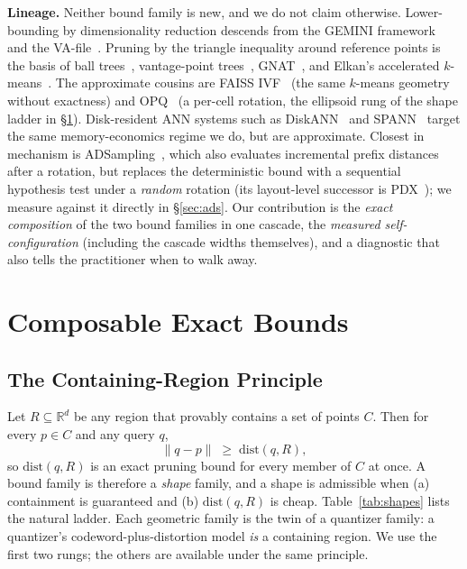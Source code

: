 \documentclass[sigconf,nonacm]{acmart}
\begin{document}
\textbf{Lineage.} Neither bound family is new, and we do not claim
otherwise. Lower-bounding by dimensionality reduction descends from the
GEMINI framework~\cite{gemini} and the VA-file~\cite{vafile}. Pruning by
the triangle inequality around reference points is the basis of ball
trees~\cite{balltree}, vantage-point trees~\cite{vptree}, GNAT~\cite{gnat},
and Elkan's accelerated $k$-means~\cite{elkan}. The approximate cousins are
FAISS IVF~\cite{faiss} (the same $k$-means geometry without exactness) and
OPQ~\cite{opq} (a per-cell rotation, the ellipsoid rung of the shape ladder
in \S\ref{sec:theory}). Disk-resident ANN systems such as
DiskANN~\cite{diskann} and SPANN~\cite{spann} target the same
memory-economics regime we do, but are approximate. Closest in mechanism is
ADSampling~\cite{adsampling}, which also evaluates incremental prefix
distances after a rotation, but replaces the deterministic bound with a
sequential hypothesis test under a \emph{random} rotation (its layout-level
successor is PDX~\cite{pdx}); we measure against it directly in
\S\ref{sec:ads}. Our contribution is the \emph{exact composition} of the
two bound families in one cascade, the \emph{measured self-configuration}
(including the cascade widths themselves), and a diagnostic that also tells
the practitioner when to walk away.

\section{Composable Exact Bounds}
\label{sec:theory}

\subsection{The Containing-Region Principle}

Let $R \subseteq \mathbb{R}^d$ be any region that provably contains a set of
points $C$. Then for every $p \in C$ and any query $q$,
\begin{equation}
\lVert q - p \rVert \;\ge\; \mathrm{dist}(q, R),
\end{equation}
so $\mathrm{dist}(q,R)$ is an exact pruning bound for every member of $C$
at once. A bound family is therefore a \emph{shape} family, and a shape is
admissible when (a) containment is guaranteed and (b) $\mathrm{dist}(q,R)$
is cheap. Table~\ref{tab:shapes} lists the natural ladder. Each geometric
family is the twin of a quantizer family: a quantizer's
codeword-plus-distortion model \emph{is} a containing region. We use the
first two rungs; the others are available under the same principle.
\end{document}
